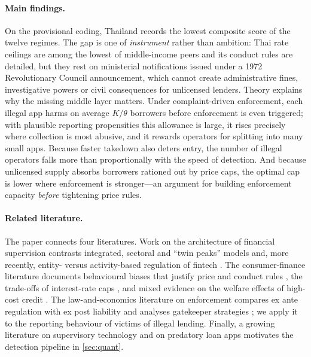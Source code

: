 \documentclass[11pt]{article}
\theoremstyle{plain}
\theoremstyle{definition}
\theoremstyle{remark}
\begin{document}
\paragraph{Main findings.} On the provisional coding, Thailand records the lowest composite score of the twelve regimes. The gap is one of \emph{instrument} rather than ambition: Thai rate ceilings are among the lowest of middle-income peers and its conduct rules are detailed, but they rest on ministerial notifications issued under a 1972 Revolutionary Council announcement, which cannot create administrative fines, investigative powers or civil consequences for unlicensed lenders. Theory explains why the missing middle layer matters. Under complaint-driven enforcement, each illegal app harms on average $K/\theta$ borrowers before enforcement is even triggered; with plausible reporting propensities this allowance is large, it rises precisely where collection is most abusive, and it rewards operators for splitting into many small apps. Because faster takedown also deters entry, the number of illegal operators falls more than proportionally with the speed of detection. And because unlicensed supply absorbs borrowers rationed out by price caps, the optimal cap is lower where enforcement is stronger---an argument for building enforcement capacity \emph{before} tightening price rules.

\paragraph{Related literature.} The paper connects four literatures. Work on the architecture of financial supervision contrasts integrated, sectoral and ``twin peaks'' models \citep{Taylor1995,Llewellyn2006} and, more recently, entity- versus activity-based regulation of fintech \citep{Restoy2021}. The consumer-finance literature documents behavioural biases that justify price and conduct rules \citep{Campbell2011,BarGillWarren2008}, the trade-offs of interest-rate caps \citep{MaimboHenriquez2014,Ferrari2018,SafavianZia2018}, and mixed evidence on the welfare effects of high-cost credit \citep{Melzer2011,Morse2011,SkibaTobacman2019,Zinman2010}. The law-and-economics literature on enforcement compares ex ante regulation with ex post liability \citep{Shavell1984,Kolstad1990,PolinskyShavell2000} and analyses gatekeeper strategies \citep{Kraakman1986}; we apply it to the reporting behaviour of victims of illegal lending. Finally, a growing literature on supervisory technology \citep{BroedersPrenio2018,diCastri2019} and on predatory loan apps \citep{Ramesh2022,Munyendo2022} motivates the detection pipeline in \cref{sec:quant}.
\end{document}
